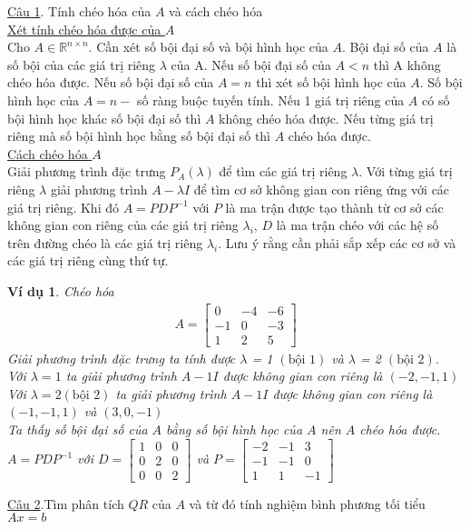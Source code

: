 \documentclass[12pt,a4paper]{book}
\newtheorem{vd}{Ví dụ}
\newcommand{\m}[1]{
\begin{bmatrix}
#1
\end{bmatrix}
}
\newcommand{\n}[1]{
\left(#1\right)
}
\begin{document}
\underline{Câu 1}. Tính chéo hóa của $A$ và cách chéo hóa \\
\underline{Xét tính chéo hóa được của $A$}\\
Cho $A \in \mathbb{R}^{n \times n}$. Cần xét số bội đại số và bội hình học của $A$. Bội đại số của $A$ là số bội của các giá trị riêng $\lambda$ của A. Nếu số bội đại số của $A < n$ thì A không chéo hóa được. Nếu số bội đại số của $A = n$ thì xét số bội hình học của $A$. Số bội hình học của $A = n -$ số ràng buộc tuyến tính. Nếu 1 giá trị riêng của $A$ có số bội hình học khác số bội đại số thì $A$ không chéo hóa được. Nếu từng giá trị riêng mà số bội hình học bằng số bội đại số thì $A$ chéo hóa được. \\
\underline{Cách chéo hóa $A$}\\
Giải phương trình đặc trưng $P_A(\lambda)$ để tìm các giá trị riêng $\lambda$. Với từng giá trị riêng $\lambda$ giải phương trình $A -\lambda I$ để tìm cơ sở không gian con riêng ứng với các giá trị riêng. Khi đó $A = PDP^{-1}$ với $P$ là ma trận được tạo thành từ cơ sở các không gian con riêng của các giá trị riêng $\lambda_{i}$, $D$ là ma trận chéo với các hệ số trên đường chéo là các giá trị riêng $\lambda_{i}$. Lưu ý rằng cần phải sắp xếp các cơ sở và các giá trị riêng cùng thứ tự.
\begin{vd}
Chéo hóa  
\begin{align*}
A = 
\m{
0 & -4 & -6 \\
-1 & 0 & -3 \\
1 & 2 & 5
}
\end{align*} 
Giải phương trình đặc trưng ta tính được $\lambda$ = 1 $\n{\mbox{bội 1}}$ và $\lambda$ = 2 $\n{\mbox{bội 2}}$.\\
Với $\lambda = 1$ ta giải phương trình $A - 1I$ được không gian con riêng là $\left(-2,-1,1\right)$ \\
Với $\lambda = 2\n{\mbox{bội 2}}$ ta giải phương trình $A - 1I$ được không gian con riêng là $\n{-1,-1,1}$ và $\n{3,0,-1}$ \\
Ta thấy số bội đại số của $A$ bằng số bội hình học của $A$ nên $A$ chéo hóa được. \\
$A = PDP^{-1}$ với $D = \m{
1 & 0 & 0\\
0 & 2 & 0\\
0 & 0 & 2}$ và $P = \m{
-2 & -1 & 3\\
-1 & -1 & 0\\
1 & 1 & -1
}$
\end{vd}
\underline{Câu 2}.Tìm phân tích $QR$ của $A$ và từ đó tính nghiệm bình phương tối tiểu $Ax = b$ \\
\end{document}
